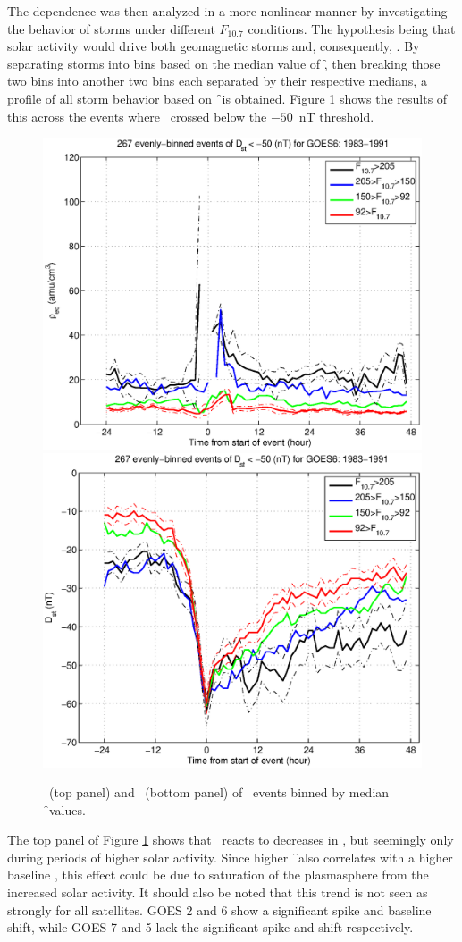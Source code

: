 The dependence was then analyzed in a more nonlinear manner by investigating the behavior of storms under different $F_{10.7}$ conditions. The hypothesis being that solar activity would drive both geomagnetic storms and, consequently, \req. By separating storms into bins based on the median value of \f, then breaking those two bins into another two bins each separated by their respective medians, a profile of all storm behavior based on \f\ is obtained. Figure \ref{fig:HighLowF107rhoeq} shows the results of this across the events where \dst\ crossed below the $-50$~nT threshold. 

\begin{figure}[htp!]
	\centering
	\includegraphics[width=0.7\linewidth]{Figures/HighLowF107rhoeq-Dst50-GOES6-1983-1991}
	\includegraphics[width=0.7\linewidth]{Figures/HighLowF107Dst-Dst50-GOES6-1983-1991}	
	\caption{\req\ (top panel) and \dst\ (bottom panel) of \dst\ events binned by median \f\ values.}
	\label{fig:HighLowF107rhoeq}
\end{figure}

The top panel of Figure \ref{fig:HighLowF107rhoeq} shows that \req\ reacts to decreases in \dst, but seemingly only during periods of higher solar activity. Since higher \f\ also correlates with a higher baseline \req, this effect could be due to saturation of the plasmasphere from the increased solar activity. It should also be noted that this trend is not seen as strongly for all satellites. GOES 2 and 6 show a significant spike and baseline shift, while GOES 7 and 5 lack the significant spike and shift respectively. 

